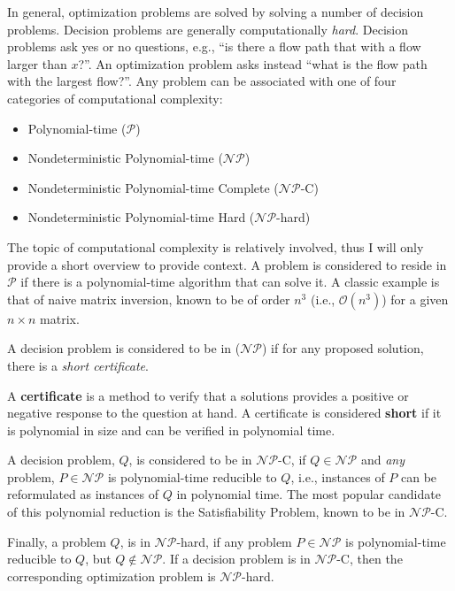 
In general, optimization problems are solved by solving a number of decision
problems. Decision problems are generally computationally
\textit{hard}. Decision problems ask yes or no questions, e.g., ``is there a
flow path that with a flow larger than $x$?''. An optimization problem asks
instead ``what is the flow path with the largest flow?''. Any problem can be
associated with one of four categories of computational complexity:

\begin{itemize}
        \item Polynomial-time ($\mathcal{P}$)
        \item Nondeterministic Polynomial-time ($\mathcal{NP}$)
        \item Nondeterministic Polynomial-time Complete  ($\mathcal{NP}$-C)
        \item Nondeterministic Polynomial-time Hard  ($\mathcal{NP}$-hard)
\end{itemize}

The topic of computational complexity is relatively involved, thus I will only
provide a short overview to provide context. A problem is considered to reside
in $\mathcal{P}$ if there is a polynomial-time algorithm that can solve it. A
classic example is that of naive matrix inversion, known to be of order $n^3$
(i.e., $\mathcal{O}(n^3)$) for a given $n \times n$ matrix.

A decision problem is considered to be in ($\mathcal{NP}$) if for any proposed
solution, there is a \textit{short certificate}.

\begin{define}
A \textbf{certificate} is a method to verify that a solutions provides a
positive or negative response to the question at hand. A certificate is
considered \textbf{short} if it is polynomial in size and can be verified in
polynomial time.
\end{define}

A decision problem, $Q$, is considered to be in $\mathcal{NP}$-C, if
$Q \in \mathcal{NP}$ and \textit{any} problem, $P \in \mathcal{NP}$ is
polynomial-time reducible to $Q$, i.e., instances of $P$ can be reformulated as
instances of $Q$ in polynomial time. The most popular candidate of this
polynomial reduction is the Satisfiability Problem, known to be in
$\mathcal{NP}$-C.

Finally, a problem $Q$, is in $\mathcal{NP}$-hard, if any problem
$P \in \mathcal{NP}$ is polynomial-time reducible to $Q$, but
$Q \not\in \mathcal{NP}$. If a decision problem is in $\mathcal{NP}$-C, then the
corresponding optimization problem is $\mathcal{NP}$-hard.

